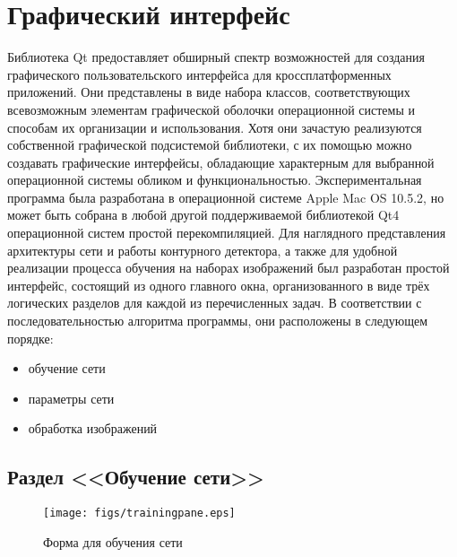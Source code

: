 \documentclass[a4paper,12pt]{report}
\begin{document}
\section{Графический интерфейс}
Библиотека Qt предоставляет обширный спектр возможностей для создания графического пользовательского интерфейса для кроссплатформенных приложений. Они представлены в виде набора классов, соответствующих всевозможным элементам графической оболочки операционной системы и способам их организации и использования. Хотя они зачастую реализуются собственной графической подсистемой библиотеки, с их помощью можно создавать графические интерфейсы, обладающие характерным для выбранной операционной системы обликом и функциональностью. Экспериментальная программа была разработана в операционной системе Apple Mac OS 10.5.2, но может быть собрана в любой другой поддерживаемой библиотекой Qt4 операционной систем простой перекомпиляцией. Для наглядного представления архитектуры сети и работы контурного детектора, а также для удобной реализации процесса обучения на наборах изображений был разработан простой интерфейс, состоящий из одного главного окна, организованного в виде трёх логических разделов для каждой из перечисленных задач. В соответствии с последовательностью алгоритма программы, они расположены в следующем порядке:
\begin{itemize}
\item{обучение сети}
\item{параметры сети}
\item{обработка изображений}
\end{itemize}

\subsection{Раздел <<Обучение сети>>}
\begin{center}
\begin{figure}[h]
\begin{center}
\texttt{[image: figs/trainingpane.eps]}
\end{center}\caption{Форма для обучения сети}
\label{trainingpane}
\end{figure}
\end{center}
\end{document}
